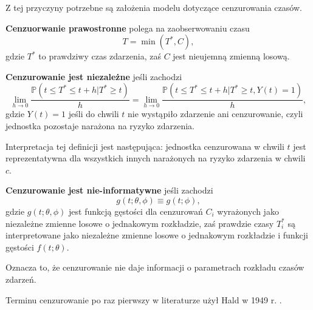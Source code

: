Z tej przyczyny potrzebne są założenia modelu dotyczące cenzurowania czasów.

\begin{definition}
\textbf{Cenzuorwanie prawostronne} polega na zaobserwowaniu czasu 
$$T= \min(T^*, C),$$
gdzie $T^*$ to prawdziwy czas zdarzenia, zaś $C$ jest nieujemną zmienną losową.
\end{definition}


\begin{definition}
\textbf{Cenzurowanie jest niezależne} jeśli zachodzi
$$ \lim\limits_{h\rightarrow 0}\dfrac{\mathbb{P}(t \leq T^* \leq t +h | T^* \geq t)}{h} =  \lim\limits_{h\rightarrow 0}\dfrac{\mathbb{P}(t \leq T^* \leq t +h | T^* \geq t, Y(t) = 1)}{h},$$
gdzie $Y(t) = 1$ jeśli do chwili $t$ nie wystąpiło zdarzenie ani cenzurowanie, czyli jednostka pozostaje narażona na ryzyko zdarzenia.
\end{definition}

Interpretacja tej definicji jest następująca: jednostka cenzurowana w chwili $t$ jest reprezentatywna dla wszystkich innych narażonych na ryzyko zdarzenia w chwili $c$.

\begin{definition}
\textbf{Cenzurowanie jest nie-informatywne} jeśli zachodzi
$$g(t;\theta, \phi) \equiv g(t;\phi),$$
gdzie $g(t;\theta, \phi)$ jest funkcją gęstości dla cenzurowań $C_i$ wyrażonych jako niezależne zmienne losowe o jednakowym rozkładzie, zaś prawdzie czasy $T^*_i$ są interpretowane jako niezależne zmienne losowe o jednakowym rozkładzie i funkcji gęstości $f(t;\theta)$.
\end{definition}

Oznacza to, że cenzurowanie nie daje informacji o parametrach rozkładu czasów zdarzeń.

Terminu cenzurowanie po raz pierwszy w literaturze użył Hald w 1949 r. \cite{hald}.

